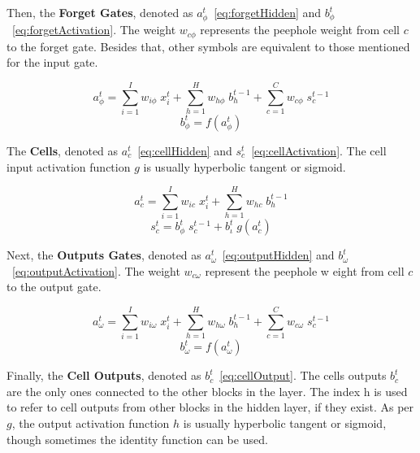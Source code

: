 Then, the \textbf{Forget Gates}, denoted as $a_\phi^t$~\ref{eq:forgetHidden} and 
$b_\phi^t$~\ref{eq:forgetActivation}. The weight $w_{c\phi}$ represents the peephole weight 
from cell $c$ to the forget gate. Besides that, other symbols are equivalent to those 
mentioned for the input gate.

\begin{equation} \label{eq:forgetHidden}
    a_\phi^t = \sum_{i=1}^I w_{i\phi} \; x_i^t + \sum_{h=1}^H w_{h\phi} \; b_h^{t-1} + \sum_{c=1}^C w_{c\phi} \; s_c^{t-1}
\end{equation}
\begin{equation} \label{eq:forgetActivation}
    b_\phi^t = f(a_\phi^t)
\end{equation}

The \textbf{Cells}, denoted as $a_c^t$~\ref{eq:cellHidden} and $s_c^t$~\ref{eq:cellActivation}. The 
cell input activation function $g$ is usually hyperbolic tangent or sigmoid.

\begin{equation} \label{eq:cellHidden}
    a_c^t = \sum_{i=1}^I w_{ic} \; x_i^t + \sum_{h=1}^H w_{hc} \; b_h^{t-1}
\end{equation}
\begin{equation} \label{eq:cellActivation}
    s_c^t = b_\phi^t \; s_c^{t-1} + b_\iota^t \; g(a_c^t)
\end{equation}

Next, the \textbf{Outputs Gates}, denoted as $a_\omega^t$~\ref{eq:outputHidden} and 
$b_\omega^t$~\ref{eq:outputActivation}. The weight $w_{c\omega}$ represent the peephole w
eight from cell $c$ to the output gate.

\begin{equation} \label{eq:outputHidden}
    a_\omega^t = \sum_{i=1}^I w_{i\omega} \; x_i^t + \sum_{h=1}^H w_{h\omega} \; b_h^{t-1} + \sum_{c=1}^C w_{c\omega} \; s_c^{t-1}
\end{equation}
\begin{equation} \label{eq:outputActivation}
    b_\omega^t = f(a_\omega^t)
\end{equation}

Finally, the \textbf{Cell Outputs}, denoted as $b_c^t$~\ref{eq:cellOutput}. The cells outputs $b_c^t$ 
are the only ones connected to the other blocks in the layer. The index h is used to refer 
to cell outputs from other blocks in the hidden layer, if they exist. As per $g$, the output 
activation function $h$ is usually hyperbolic tangent or sigmoid, though sometimes the 
identity function can be used. 

